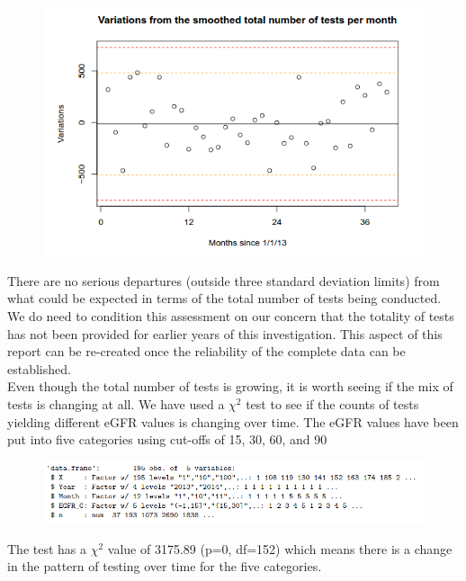 \documentclass[11pt]{article}
\begin{document}
\begin{figure}[htp]
\centering
\includegraphics[scale=0.50]{fig4.png}
\caption{}
\label{}
\end{figure}

There are no serious  departures (outside three standard deviation limits) from what could be expected in terms of the total number of tests being conducted. We do need to condition this assessment on our concern that the totality of tests has not been provided for earlier years of this investigation. This aspect of this report can be re-created once the reliability of the complete data can be established.\\

Even though the total number of tests is growing, it is worth seeing if the mix of tests is changing at all. We have used a $\chi^2$ test to see if the counts of tests yielding different eGFR values is changing over time. The eGFR values have been put into five categories using cut-offs of 15, 30, 60, and 90\\

\begin{figure}[htp]
\centering
\includegraphics[scale=0.50]{fig5.png}
\caption{}
\label{}
\end{figure}

The test has a $\chi^2$ value of 3175.89 (p=0, df=152) which means there is a change in the pattern of testing over time for the five categories.\\
\end{document}
